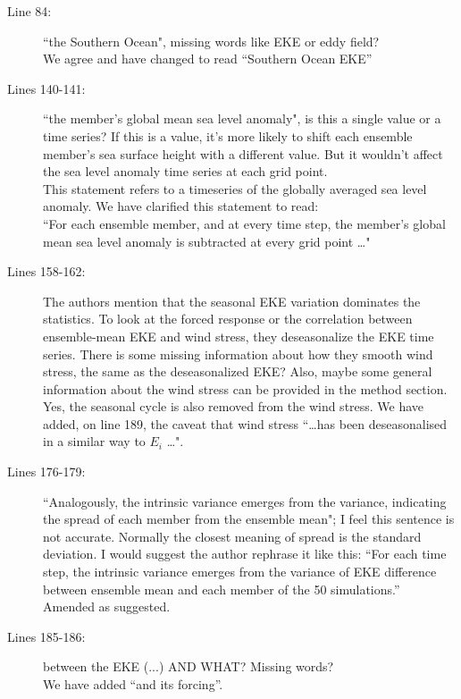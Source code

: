 \documentclass[11pt]{article}
\begin{document}
{\color{blue} 
\begin{description}
\item[ Line 84: ] ``the Southern Ocean", missing words like EKE or eddy field?\\
{\color{black}  We agree and have changed to read ``Southern Ocean EKE'' }

\item[ Lines 140-141:] ``the member's global mean sea level anomaly", is this a single value or a time series? If this is a value, it's more likely to shift each ensemble member's sea surface height with a different value. But it wouldn't affect the sea level anomaly time series at each grid point. \\
{\color{black} This statement refers to a timeseries of the globally averaged sea level anomaly. We have clarified this statement to read:\\
 ``For each ensemble member, and at every time step, the member's global mean sea level anomaly is subtracted at every grid point  \ldots" }

\item[Lines 158-162:] The authors mention that the seasonal EKE variation dominates the statistics. To look at the forced response or the correlation between ensemble-mean EKE and wind stress, they deseasonalize the EKE time series. There is some missing information about how they smooth wind stress, the same as the deseasonalized EKE? Also, maybe some general information about the wind stress can be provided in the method section.\\
{\color{black} Yes, the seasonal cycle is also removed from the wind stress. We have added, on line 189, the caveat that wind stress ``\ldots has been deseasonalised in a similar way to $E_i$ \ldots". }

\item[Lines 176-179:] ``Analogously, the intrinsic variance emerges from the variance, indicating the spread of each member from the ensemble mean"; I feel this sentence is not accurate. Normally the closest meaning of spread is the standard deviation. I would suggest the author rephrase it like this: ``For each time step, the intrinsic variance emerges from the variance of EKE difference between ensemble mean and each member of the 50 simulations.'' \\
{\color{black} Amended as suggested. }

\item[Lines 185-186:] between the EKE (...) AND WHAT? Missing words?\\
{\color{black} We have added ``and its forcing''. }


\end{description}}
\end{document}
